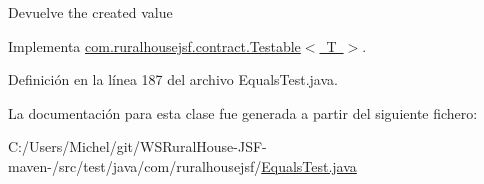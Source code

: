 \begin{DoxyReturn}{Devuelve}
the created value 
\end{DoxyReturn}


Implementa \mbox{\hyperlink{interfacecom_1_1ruralhousejsf_1_1contract_1_1_testable_ae4546a381488faaba1ef7c0f8688de9c}{com.\+ruralhousejsf.\+contract.\+Testable$<$ T $>$}}.



Definición en la línea 187 del archivo Equals\+Test.\+java.



La documentación para esta clase fue generada a partir del siguiente fichero\+:\begin{DoxyCompactItemize}
\item 
C\+:/\+Users/\+Michel/git/\+W\+S\+Rural\+House-\/\+J\+S\+F-\/maven-\//src/test/java/com/ruralhousejsf/\mbox{\hyperlink{_equals_test_8java}{Equals\+Test.\+java}}\end{DoxyCompactItemize}
